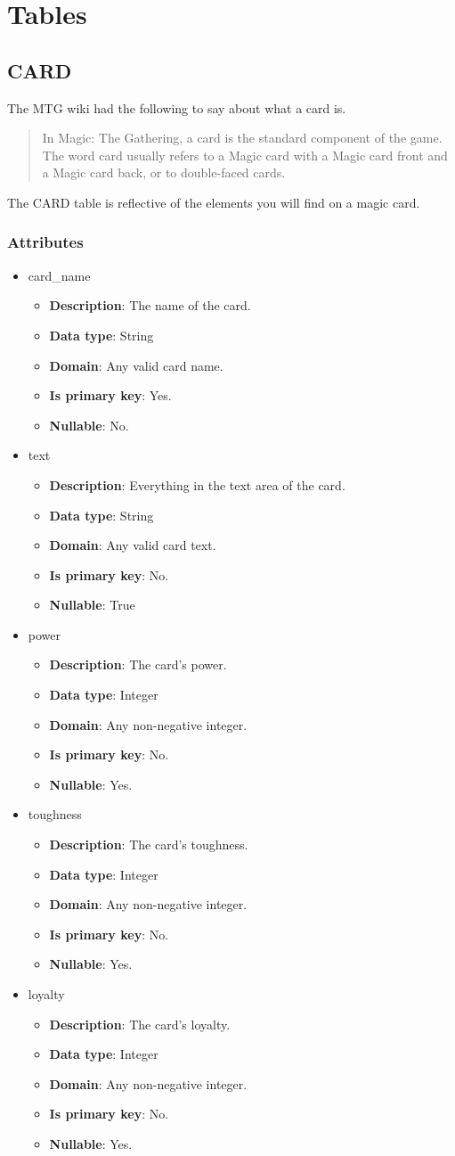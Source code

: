 \documentclass{article}
\newcommand{\tablesection}[2] {
    \subsection{#1}  %
    #2  %
    \subsubsection{Attributes}
}
\newcommand{\attribute}[6] {
    \begin{itemize}
        \item {#1}  %
            \begin{itemize}
                \item \textbf{Description}: #2  %
                \item \textbf{Data type}: #3  %
                \item \textbf{Domain}: #4  %
                \item \textbf{Is primary key}: #5  %
                \item \textbf{Nullable}: #6  %
            \end{itemize}
    \end{itemize}
}
\begin{document}

\section{Tables}
\tablesection{CARD}{
    The MTG wiki had the following to say about what a card is.
    \begin{quote}
        In Magic: The Gathering, a card is the standard component of the game. The word card usually refers to a Magic card with a Magic card front and a Magic card back, or to double-faced cards.
    \end{quote}

    The CARD table is reflective of the elements you will find on a magic card.
}
\attribute{card\_name}{The name of the card.}{String}{Any valid card name.}{Yes.}{No.}
\attribute{text}{Everything in the text area of the card.}{String}{Any valid card text.}{No.}{True}
\attribute{power}{The card's power.}{Integer}{Any non-negative integer.}{No.}{Yes.}
\attribute{toughness}{The card's toughness.}{Integer}{Any non-negative integer.}{No.}{Yes.}
\attribute{loyalty}{The card's loyalty.}{Integer}{Any non-negative integer.}{No.}{Yes.}
\end{document}
